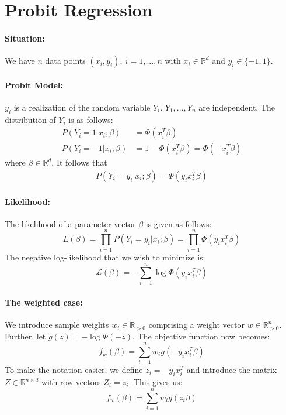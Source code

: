 \section{Probit Regression}

\paragraph{Situation:}
We have $n$ data points $(x_i, y_i), \ i=1,...,n$ with
$x_i \in \mathbb{R}^d$ and $y_i \in \{ -1, 1\}$.

\paragraph{Probit Model:}
$y_i$ is a realization of the random variable $Y_i$.
$Y_1, ..., Y_n$ are independent.
The distribution of $Y_i$ is as follows:
\begin{align*}
    P(Y_i = 1 | x_i; \beta)  & = \Phi(x_i^T \beta)                          \\
    P(Y_i = -1 | x_i; \beta) & = 1 - \Phi(x_i^T \beta) = \Phi(-x_i^T \beta)
\end{align*}
where $\beta \in \mathbb{R}^d$.
It follows that
\begin{align*}
    P(Y_i = y_i | x_i; \beta) = \Phi(y_i x_i^T \beta)
\end{align*}

\paragraph{Likelihood:}
The likelihood of a parameter vector $\beta$ is given as follows:
\begin{equation*}
    L(\beta) = \prod_{i=1}^n P(Y_i = y_i | x_i; \beta) = \prod_{i=1}^n \Phi(y_i x_i^T \beta)
\end{equation*}
The negative log-likelihood that we wish to minimize is:
\begin{equation*}
    \mathcal{L}(\beta) = -\sum_{i=1}^n \log \Phi(y_i x_i^T \beta)
\end{equation*}

\paragraph{The weighted case:}
We introduce sample weights $w_i \in \mathbb{R}_{>0}$
comprising a weight vector $w \in \mathbb{R}_{>0}^n$.
Further, let $g(z) = -\log \Phi(-z)$.
The objective function now becomes:
\begin{equation*}
    f_w(\beta) = \sum_{i=1}^n w_i g(-y_i x_i^T \beta)
\end{equation*}
To make the notation easier, we define $z_i = -y_i x_i^T$ and introduce
the matrix $Z \in \mathbb{R}^{n \times d}$ with row vectors $Z_i = z_i$.
This gives us:
\begin{equation*}
    f_w(\beta) = \sum_{i=1}^n w_i g(z_i \beta)
\end{equation*}

